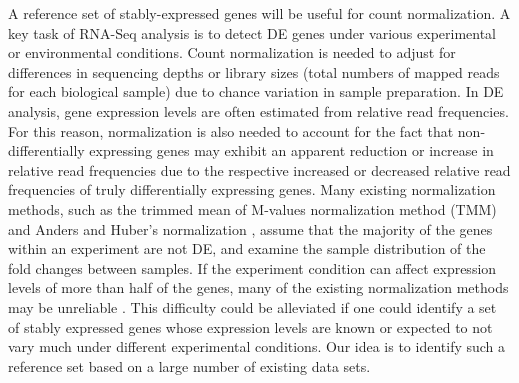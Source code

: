 \documentclass[letterpaper,12pt]{article}
\begin{document}
A reference set of stably-expressed genes will be useful for count
normalization.  A key task of RNA-Seq analysis is to detect DE genes under
various experimental or environmental conditions. Count normalization is
needed to adjust for differences in sequencing depths or library sizes (total
numbers of mapped reads for each biological sample) due to chance variation in
sample preparation.  In DE analysis, gene expression levels are often
estimated from relative read frequencies. For this reason, normalization is also 
needed to account for the fact that non-differentially expressing genes may exhibit
 an apparent reduction or increase in relative read frequencies due to the respective 
 increased or decreased relative read frequencies of truly differentially expressing genes.
 Many existing normalization methods, such as the trimmed
mean of M-values normalization method (TMM) \citep{robinson2010scaling} and
Anders and Huber's normalization \citep{anders2010differential}, assume that the
majority of the genes within an experiment are not DE, and examine the sample
distribution of the fold changes between samples.
If the experiment condition can affect expression levels of more than half of
the genes, many of the existing normalization methods may be unreliable
\citep{loven2012revisiting, wu2013use}.  This difficulty could be
alleviated if one could identify a set of stably expressed genes whose
expression levels are known or expected to not vary much under different
experimental conditions. Our idea is to identify such a reference set based on
a large number of existing data sets.
\end{document}
